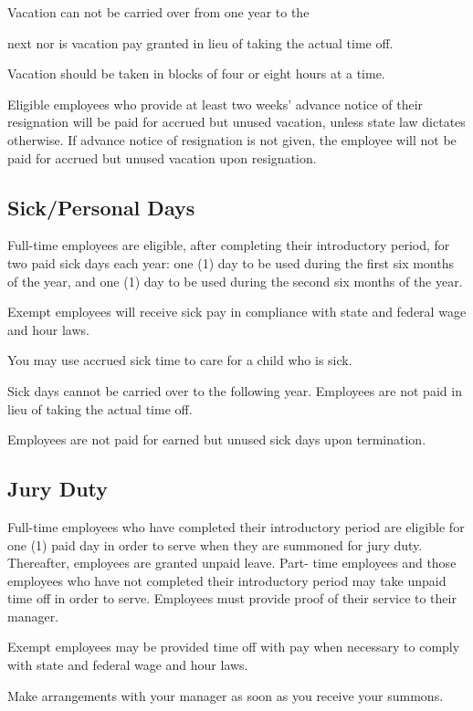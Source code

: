 Vacation can not be carried over from one year to the

next nor is vacation pay granted in lieu of taking the actual time off.

Vacation should be taken in blocks of four or eight hours at a time.

Eligible employees who provide at least two weeks’ advance notice of their resignation will be paid for accrued but unused vacation, unless state law dictates otherwise. If advance notice of resignation is not given, the employee will not be paid for accrued but unused vacation upon resignation.

\subsection{Sick/Personal Days}

Full-time employees are eligible, after completing their introductory period, for two paid sick days each year: one (1) day to be used during the first six months of the year, and one (1) day to be used during the second six months of the year.

Exempt employees will receive sick pay in compliance with state and federal wage and hour laws.

You may use accrued sick time to care for a child who is sick.

Sick days cannot be carried over to the following year. Employees are not paid in lieu of taking the actual time off.

Employees are not paid for earned but unused sick days upon termination.

\subsection{Jury Duty}

Full-time employees who have completed their introductory period are eligible for one (1) paid day in order to serve when they are summoned for jury duty. Thereafter, employees are granted unpaid leave. Part- time employees and those employees who have not completed their introductory period may take unpaid time off in order to serve. Employees must provide proof of their service to their manager.

Exempt employees may be provided time off with pay when necessary to comply with state and federal wage and hour laws.

Make arrangements with your manager as soon as you receive your summons.

